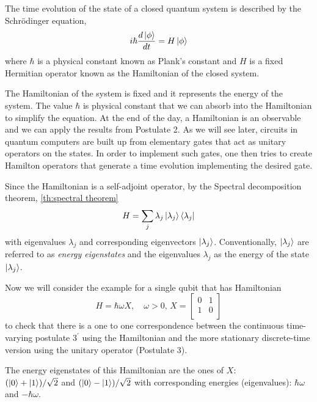 \begin{tcolorbox}[title=Postulate $3^\prime$]

    The time evolution of the state of a closed quantum system is described by the Schrödinger equation,
    \begin{equation}
        i \hbar \frac{d \ket{\phi}}{dt} = H \ket{\phi}
    \end{equation}
    where $\hbar$ is a physical constant known as Plank's constant and $H$ is a fixed Hermitian operator known as the Hamiltonian of the closed system.
\end{tcolorbox}

The Hamiltonian of the system is fixed and it represents the energy of the system. The value $\hbar$ is physical constant that we can absorb into the Hamiltonian to simplify the equation. At the end of the day, a Hamiltonian is an observable and we can apply the results from Postulate 2. As we will see later, circuits in quantum computers are built up from elementary gates that act as unitary operators on the states. In order to implement such gates, one then tries to create Hamilton operators that generate a time evolution implementing the desired gate.


Since the Hamiltonian is a self-adjoint operator, by the Spectral decomposition theorem, \autoref{th:spectral theorem}
$$H = \sum_{j} \lambda_j \ket{\lambda_j} \bra{\lambda_j}$$
with eigenvalues $\lambda_j$ and corresponding eigenvectors $\ket{\lambda_j}$. Conventionally, $\ket{\lambda_j}$ are referred to as \textit{energy eigenstates} and the eigenvalues $\lambda_j$ as the energy of the state $\ket{\lambda_j}$. 

Now we will consider the example for a single qubit that has Hamiltonian $$H=\hbar \omega X, \quad \omega >0,\, 
        X = \begin{bmatrix}
        0&1\\
        1&0\\
        \end{bmatrix} $$
to check that there is a one to one correspondence between the continuous time-varying postulate $3^\prime$ using the Hamiltonian and the more stationary discrete-time version using the unitary operator (Postulate 3). 

The energy eigenstates of this Hamiltonian are the ones of $X$: \\$(\ket{0} + \ket{1})/\sqrt{2}$ and $(\ket{0} - \ket{1})/\sqrt{2}$ with corresponding energies (eigenvalues): $\hbar \omega$ and $-\hbar \omega$. 

